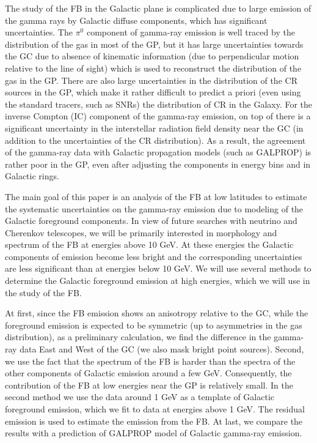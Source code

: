 The study of the FB in the Galactic plane is complicated due to large emission of the gamma rays by Galactic diffuse components,
which has significant uncertainties.
The $\pi^0$ component of gamma-ray emission is well traced by the distribution of the gas in most of the GP,
but it has large uncertainties towards the GC due to absence of kinematic information (due to perpendicular motion relative to the line of sight)
which is used to reconstruct the distribution of the gas in the GP.
There are also large uncertainties in the distribution of the CR sources in the GP,
which make it rather difficult to predict a priori (even using the standard tracers, such as SNRs) the distribution
of CR in the Galaxy.
For the inverse Compton (IC) component of the gamma-ray emission, on top of 
there is a significant uncertainty in the interstellar radiation field density near the GC (in addition to 
the uncertainties of the CR distribution).
As a result, the agreement of the gamma-ray data with Galactic propagation models (such as GALPROP) is rather
poor in the GP, even after adjusting the components in energy bins and in Galactic rings.

The main goal of this paper is an analysis of the FB at low latitudes to estimate the systematic uncertainties on the gamma-ray 
emission due to modeling of the Galactic foreground components.
In view of future searches with neutrino and Cherenkov telescopes, 
we will be primarily interested in morphology and spectrum of the FB at energies above 10 GeV.
At these energies the Galactic components of emission become less bright
and the corresponding uncertainties are less significant than at energies below 10 GeV.
We will use several methods to determine the Galactic foreground emission at high energies,
which we will use in the study of the FB.

At first, since the FB emission shows an anisotropy relative to the GC, 
while the foreground emission is expected to be symmetric (up to asymmetries in the gas distribution),
as a preliminary calculation, we find the difference in the gamma-ray data East and West of the GC 
(we also mask bright point sources).
Second, we use the fact that the spectrum of the FB is harder than the spectra of the other components of Galactic emission
around a few GeV.
Consequently, the contribution of the FB at low energies near the GP is relatively small. 
In the second method we use the data around 1 GeV as a template of Galactic foreground emission, 
which we fit to data at energies above 1 GeV.
The residual emission is used to estimate the emission from the FB.
At last, we compare the results with a prediction of GALPROP model of Galactic gamma-ray emission.





